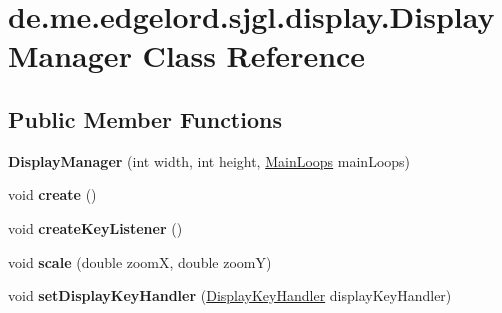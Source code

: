 \hypertarget{classde_1_1me_1_1edgelord_1_1sjgl_1_1display_1_1_display_manager}{}\section{de.\+me.\+edgelord.\+sjgl.\+display.\+Display\+Manager Class Reference}
\label{classde_1_1me_1_1edgelord_1_1sjgl_1_1display_1_1_display_manager}
\subsection*{Public Member Functions}
\begin{DoxyCompactItemize}
\item 
\mbox{\label{classde_1_1me_1_1edgelord_1_1sjgl_1_1display_1_1_display_manager_ab6222b856dc0a49a9395b8171763d40f}} 
{\bfseries Display\+Manager} (int width, int height, \mbox{\hyperlink{classde_1_1me_1_1edgelord_1_1sjgl_1_1core_1_1_main_loops}{Main\+Loops}} main\+Loops)
\item 
\mbox{\label{classde_1_1me_1_1edgelord_1_1sjgl_1_1display_1_1_display_manager_a66a3da380f0f04b4dcd285a58f1a9511}} 
void {\bfseries create} ()
\item 
\mbox{\label{classde_1_1me_1_1edgelord_1_1sjgl_1_1display_1_1_display_manager_ae772cc4cf0146ab27c6275b04d24a1ca}} 
void {\bfseries create\+Key\+Listener} ()
\item 
\mbox{\label{classde_1_1me_1_1edgelord_1_1sjgl_1_1display_1_1_display_manager_acf9d32580498ad0cf4129e10f4e5132f}} 
void {\bfseries scale} (double zoomX, double zoomY)
\item 
\mbox{\label{classde_1_1me_1_1edgelord_1_1sjgl_1_1display_1_1_display_manager_a209c97d1cdc3b39cffdd0a6f528c02fc}} 
void {\bfseries set\+Display\+Key\+Handler} (\mbox{\hyperlink{interfacede_1_1me_1_1edgelord_1_1sjgl_1_1input_1_1_display_key_handler}{Display\+Key\+Handler}} display\+Key\+Handler)

\end{DoxyCompactItemize}
